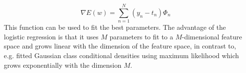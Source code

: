
\begin{equation} \label{eq:lin_reg_gradient}
\nabla E(w)=\sum_{n=1}^{N} (y_n-t_n)\Phi_n
\end{equation}
This function can be used to fit the best parameters.
The advantage of the logistic regression is that it uses $M$ parameters to fit to a $M$-dimensional feature space and grows linear with the dimension of the feature space, in contrast to, e.g. fitted Gaussian class conditional densities using maximum likelihood which grows exponentially with the dimension $M$. \cite{Bishop}